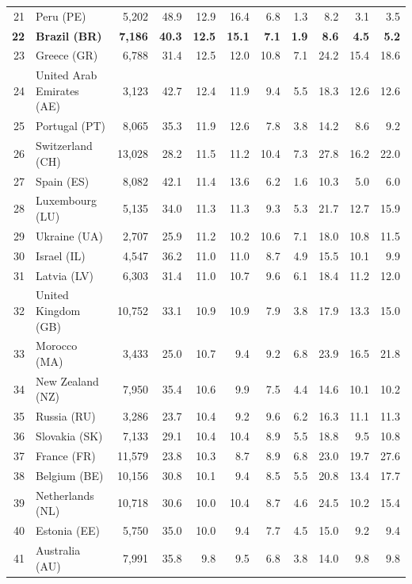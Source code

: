 \documentclass[10pt,a4paper,twocolumn]{article}
\begin{document}
\begin{tabular}{@{}rlrrrrrrrrr@{}}
21 & Peru (PE) & 5,202 & 48.9 & 12.9 & 16.4 & 6.8 & 1.3 & 8.2 & 3.1 & 3.5 \\
\textbf{22} & \textbf{Brazil (BR)} & \textbf{7,186} & \textbf{40.3} & \textbf{12.5} & \textbf{15.1} & \textbf{7.1} & \textbf{1.9} & \textbf{8.6} & \textbf{4.5} & \textbf{5.2} \\
23 & Greece (GR) & 6,788 & 31.4 & 12.5 & 12.0 & 10.8 & 7.1 & 24.2 & 15.4 & 18.6 \\
24 & United Arab Emirates (AE) & 3,123 & 42.7 & 12.4 & 11.9 & 9.4 & 5.5 & 18.3 & 12.6 & 12.6 \\
25 & Portugal (PT) & 8,065 & 35.3 & 11.9 & 12.6 & 7.8 & 3.8 & 14.2 & 8.6 & 9.2 \\
26 & Switzerland (CH) & 13,028 & 28.2 & 11.5 & 11.2 & 10.4 & 7.3 & 27.8 & 16.2 & 22.0 \\
27 & Spain (ES) & 8,082 & 42.1 & 11.4 & 13.6 & 6.2 & 1.6 & 10.3 & 5.0 & 6.0 \\
28 & Luxembourg (LU) & 5,135 & 34.0 & 11.3 & 11.3 & 9.3 & 5.3 & 21.7 & 12.7 & 15.9 \\
29 & Ukraine (UA) & 2,707 & 25.9 & 11.2 & 10.2 & 10.6 & 7.1 & 18.0 & 10.8 & 11.5 \\
30 & Israel (IL) & 4,547 & 36.2 & 11.0 & 11.0 & 8.7 & 4.9 & 15.5 & 10.1 & 9.9 \\
31 & Latvia (LV) & 6,303 & 31.4 & 11.0 & 10.7 & 9.6 & 6.1 & 18.4 & 11.2 & 12.0 \\
32 & United Kingdom (GB) & 10,752 & 33.1 & 10.9 & 10.9 & 7.9 & 3.8 & 17.9 & 13.3 & 15.0 \\
33 & Morocco (MA) & 3,433 & 25.0 & 10.7 & 9.4 & 9.2 & 6.8 & 23.9 & 16.5 & 21.8 \\
34 & New Zealand (NZ) & 7,950 & 35.4 & 10.6 & 9.9 & 7.5 & 4.4 & 14.6 & 10.1 & 10.2 \\
35 & Russia (RU) & 3,286 & 23.7 & 10.4 & 9.2 & 9.6 & 6.2 & 16.3 & 11.1 & 11.3 \\
36 & Slovakia (SK) & 7,133 & 29.1 & 10.4 & 10.4 & 8.9 & 5.5 & 18.8 & 9.5 & 10.8 \\
37 & France (FR) & 11,579 & 23.8 & 10.3 & 8.7 & 8.9 & 6.8 & 23.0 & 19.7 & 27.6 \\
38 & Belgium (BE) & 10,156 & 30.8 & 10.1 & 9.4 & 8.5 & 5.5 & 20.8 & 13.4 & 17.7 \\
39 & Netherlands (NL) & 10,718 & 30.6 & 10.0 & 10.4 & 8.7 & 4.6 & 24.5 & 10.2 & 15.4 \\
40 & Estonia (EE) & 5,750 & 35.0 & 10.0 & 9.4 & 7.7 & 4.5 & 15.0 & 9.2 & 9.4 \\
41 & Australia (AU) & 7,991 & 35.8 & 9.8 & 9.5 & 6.8 & 3.8 & 14.0 & 9.8 & 9.8 \\

\end{tabular}
\end{document}
